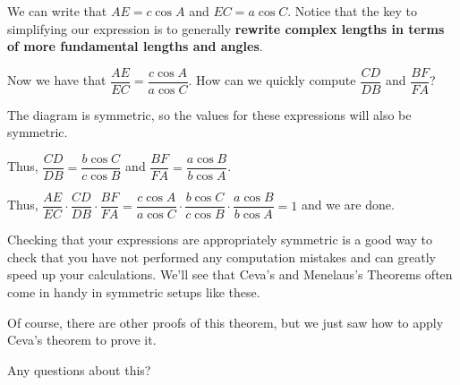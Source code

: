 




We can write that $AE = c\cos A$ and $EC = a\cos C$. Notice that the key to simplifying our expression is to generally \textbf{rewrite complex lengths in terms of more fundamental lengths and angles}.

Now we have that $\dfrac{AE}{EC} = \dfrac{c\cos A}{a\cos C}$. How can we quickly compute $\dfrac{CD}{DB}$ and $\dfrac{BF}{FA}$?



The diagram is symmetric, so the values for these expressions will also be symmetric.

Thus, $\dfrac{CD}{DB} = \dfrac{b\cos C}{c\cos B}$ and $\dfrac{BF}{FA} = \dfrac{a\cos B}{b\cos A}$.

Thus, $\dfrac{AE}{EC}\cdot \dfrac{CD}{DB}\cdot \dfrac{BF}{FA} = \dfrac{c\cos A}{a\cos C}\cdot \dfrac{b\cos C}{c\cos B}\cdot \dfrac{a\cos B}{b\cos A} = 1$ and we are done.

Checking that your expressions are appropriately symmetric is a good way to check that you have not performed any computation mistakes and can greatly speed up your calculations. We'll see that Ceva's and Menelaus's Theorems often come in handy in symmetric setups like these.

Of course, there are other proofs of this theorem, but we just saw how to apply Ceva's theorem to prove it.

Any questions about this?

